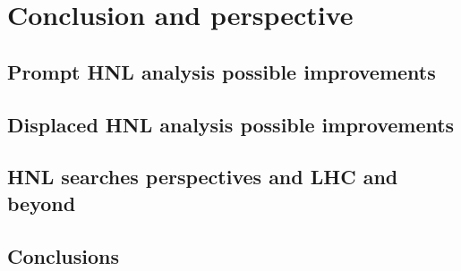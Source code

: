 
\chapter{Conclusion and perspective} %

\label{Chapter6} %

\section{Prompt HNL analysis possible improvements}
\section{Displaced HNL analysis possible improvements}
\section {HNL searches perspectives and LHC and beyond}


\section{Conclusions}
